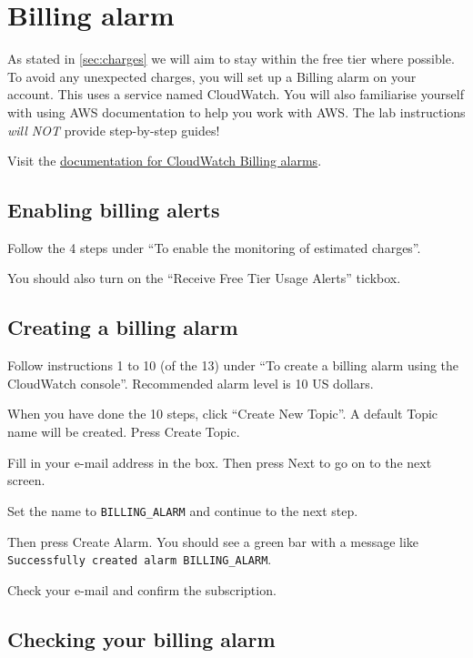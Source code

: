 \section{Billing alarm}

As stated in \autoref{sec:charges} we will aim to stay within the free tier where possible.
To avoid any unexpected charges, you will set up a Billing alarm on your account.
This uses a service named CloudWatch.
You will also familiarise yourself with using AWS documentation to help you work with AWS.
The lab instructions \textit{will NOT} provide step-by-step guides!

Visit the \href{https://docs.aws.amazon.com/AmazonCloudWatch/latest/monitoring/monitor_estimated_charges_with_cloudwatch.html}{documentation for CloudWatch Billing alarms}.

\subsection{Enabling billing alerts}

Follow the 4 steps under ``To enable the monitoring of estimated charges''.

You should also turn on the ``Receive Free Tier Usage Alerts'' tickbox.

\subsection{Creating a billing alarm}

Follow instructions 1 to 10 (of the 13) under ``To create a billing alarm using the CloudWatch console''.
Recommended alarm level is 10 US dollars.

When you have done the 10 steps, click ``Create New Topic''.
A default Topic name will be created.
Press Create Topic.

Fill in your e-mail address in the box.
Then press Next to go on to the next screen.

Set the name to \texttt{BILLING\_ALARM} and continue to the next step. 

Then press Create Alarm.
You should see a green bar with a message like \texttt{Successfully created alarm BILLING\_ALARM}.

Check your e-mail and confirm the subscription.

\subsection{Checking your billing alarm}

